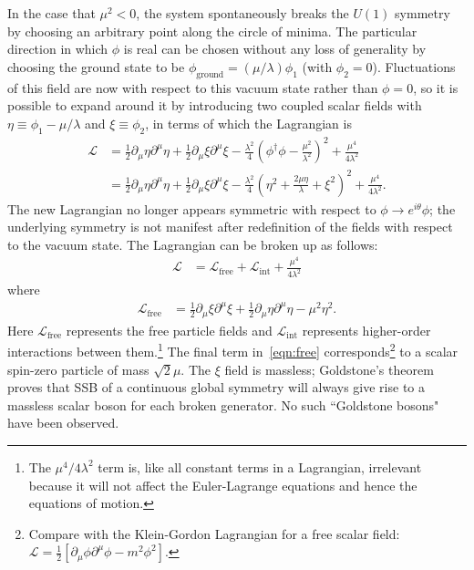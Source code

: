 In the case that $\mu^2 < 0$, the system spontaneously breaks the $U(1)$
symmetry by choosing an arbitrary point along the circle of minima. The
particular direction in which $\phi$ is real can be chosen without any loss of
generality by choosing the ground state to be
$\phi_\text{ground}=(\mu/\lambda)\phi_1$ (with $\phi_2=0$). Fluctuations of this
field are now with respect to this vacuum state rather than $\phi=0$, so it is
possible to expand around it by introducing two coupled scalar fields with $\eta
\equiv \phi_1 - \mu/\lambda$ and $\xi \equiv \phi_2$, in terms of which the
Lagrangian is
\begin{align} \mathcal{L} &= \frac{1}{2}\partial_\mu\eta\partial^\mu\eta +
  \frac{1}{2}\partial_\mu\xi\partial^\mu\xi -
  \frac{\lambda^2}{4}\left(\phi^\dagger\phi-\frac{\mu^2}{\lambda^2}\right)^2 +
  \frac{\mu^4}{4\lambda^2}\\ &= \frac{1}{2}\partial_\mu\eta\partial^\mu\eta +
  \frac{1}{2}\partial_\mu\xi\partial^\mu\xi - \frac{\lambda^2}{4}\left(\eta^2 +
  \frac{2\mu\eta}{\lambda}+\xi^2\right)^2 + \frac{\mu^4}{4\lambda^2}.
\end{align}
The new Lagrangian no longer appears symmetric with respect to $\phi \rightarrow
e^{i\theta}\phi$; the underlying symmetry is not manifest after redefinition of
the fields with respect to the vacuum state. The Lagrangian can be broken up as follows:
\begin{align} \mathcal{L} &= \mathcal{L}_\text{free} + \mathcal{L}_\text{int}+
\frac{\mu^4}{4\lambda^2} \end{align} where \begin{align} \mathcal{L}_\text{free}
  &= \frac{1}{2}\partial_\mu\xi\partial^\mu\xi +
  \frac{1}{2}\partial_\mu\eta\partial^\mu\eta - \mu^2\eta^2.\label{eqn:free}
\end{align}
Here $\mathcal{L}_\text{free}$ represents the free particle fields and
$\mathcal{L}_\text{int}$ represents higher-order interactions between
them.\footnote{The $\mu^4/ 4\lambda^2$ term is, like all constant terms in a
Lagrangian, irrelevant because it will not affect the Euler-Lagrange equations
and hence the equations of motion.} The final term in~\cref{eqn:free}
corresponds\footnote{Compare with the Klein-Gordon Lagrangian for a free scalar
field:
$\mathcal{L}=\frac{1}{2}\left[\partial_\mu\phi\partial^\mu\phi-m^2\phi^2\right]$.}
to a scalar spin-zero particle of mass $\sqrt{2}\mu$. The $\xi$ field is
massless; Goldstone's theorem~\cite{Goldstone1961} proves that SSB of a
continuous global symmetry will always give rise to a massless scalar boson for
each broken generator. No such ``Goldstone bosons" have been observed.

